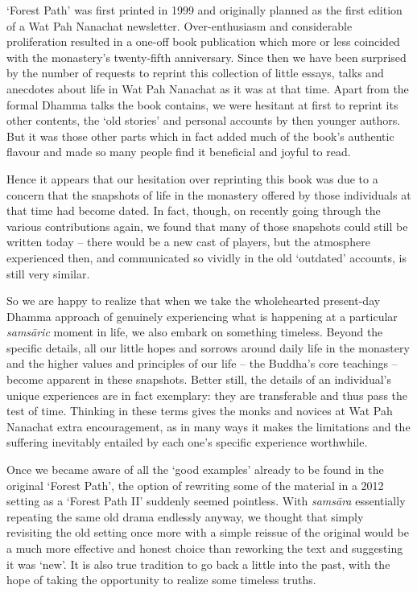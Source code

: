 
`Forest Path' was first printed in 1999 and originally planned as the
first edition of a Wat Pah Nanachat newsletter. Over-enthusiasm and
considerable proliferation resulted in a one-off book publication which
more or less coincided with the monastery's twenty-fifth anniversary. 
Since then we have been surprised by the number of requests to reprint
this collection of little essays, talks and anecdotes about life in Wat
Pah Nanachat as it was at that time. Apart from the formal Dhamma talks
the book contains, we were hesitant at first to reprint its other
contents, the `old stories' and personal accounts by then younger
authors. But it was those other parts which in fact added much of the
book's authentic flavour and made so many people find it beneficial and
joyful to read. 

Hence it appears that our hesitation over reprinting this book was due
to a concern that the snapshots of life in the monastery offered by
those individuals at that time had become dated. In fact, though, on
recently going through the various contributions again, we found that
many of those snapshots could still be written today -- there would be a
new cast of players, but the atmosphere experienced then, and
communicated so vividly in the old `outdated' accounts, is still very
similar. 

So we are happy to realize that when we take the wholehearted
present-day Dhamma approach of genuinely experiencing what is happening
at a particular \emph{samsāric} moment in life, we also embark on
something timeless. Beyond the specific details, all our little hopes
and sorrows around daily life in the monastery and the higher values and
principles of our life -- the Buddha's core teachings -- become apparent
in these snapshots. Better still, the details of an individual's unique
experiences are in fact exemplary: they are transferable and thus pass
the test of time. Thinking in these terms gives the monks and novices at
Wat Pah Nanachat extra encouragement, as in many ways it makes the
limitations and the suffering inevitably entailed by each one's specific
experience worthwhile. 

Once we became aware of all the `good examples' already to be found in
the original `Forest Path', the option of rewriting some of the material
in a 2012 setting as a `Forest Path II' suddenly seemed pointless. With
\emph{samsāra} essentially repeating the same old drama endlessly
anyway, we thought that simply revisiting the old setting once more with
a simple reissue of the original would be a much more effective and
honest choice than reworking the text and suggesting it was `new'. It is
also true tradition to go back a little into the past, with the hope of
taking the opportunity to realize some timeless truths. 

